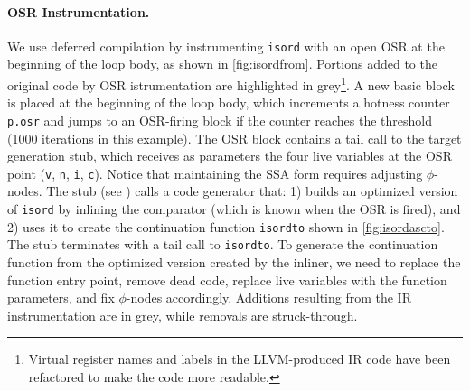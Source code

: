 \paragraph{OSR Instrumentation.}
We use deferred compilation by instrumenting {\tt isord} with an open OSR at the beginning of the loop body, as shown in \myfigure\ref{fig:isordfrom}. Portions added to the original code by OSR istrumentation are highlighted in grey\footnote{Virtual register names and labels in the LLVM-produced IR code have been refactored to make the code more readable.}.
A new basic block is placed at the beginning of the loop body, which increments a hotness counter {\tt p.osr} and jumps to an OSR-firing block if the counter reaches the threshold (1000 iterations in this example). The OSR block contains a tail call to the target generation stub, which receives as parameters the four live variables at the OSR point ({\tt v}, {\tt n}, {\tt i}, {\tt c}). Notice that maintaining the SSA form requires adjusting $\phi$-nodes. The stub (see \myfigure[...]) calls a code generator that: 1) builds an optimized version of {\tt isord} by inlining the comparator (which is known when the OSR is fired), and 2) uses it to create the continuation function {\tt isordto} shown in \myfigure\ref{fig:isordascto}. The stub terminates with a tail call to {\tt isordto}. To generate the continuation function from the optimized version created by the inliner, we need to replace the function entry point, remove dead code, replace live variables with the function parameters, and fix $\phi$-nodes accordingly. Additions resulting from the IR instrumentation are in grey, while removals are struck-through.

